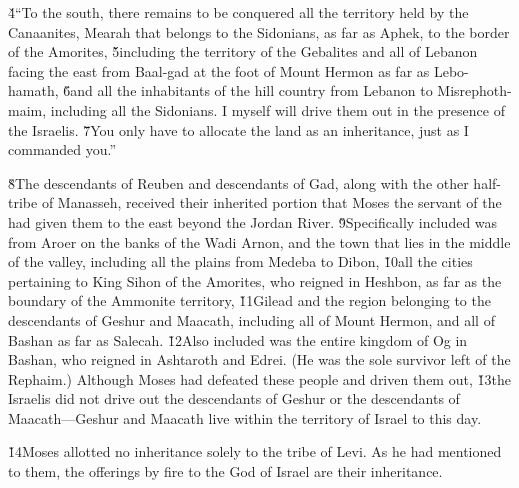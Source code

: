 \v{4}``To the south, there remains to be conquered all the territory held by the Canaanites, Mearah that belongs to the Sidonians, as far as Aphek, to the border of the Amorites, \v{5}including the territory of the Gebalites and all of Lebanon facing the east from Baal-gad at the foot of Mount Hermon as far as Lebo-hamath, \v{6}and all the inhabitants of the hill country from Lebanon to Misrephoth-maim, including all the Sidonians. I myself will drive them out in the presence of the Israelis. \v{7}You only have to allocate the land as an inheritance, just as I commanded you.''

\v{8}The descendants of Reuben and descendants of Gad, along with the other half-tribe of Manasseh, received their inherited portion that Moses the servant of the  had given them to the east beyond the Jordan River. \v{9}Specifically included was from Aroer on the banks of the Wadi Arnon, and the town that lies in the middle of the valley, including all the plains from Medeba to Dibon, \v{10}all the cities pertaining to King Sihon of the Amorites, who reigned in Heshbon, as far as the boundary of the Ammonite territory, \v{11}Gilead and the region belonging to the descendants of Geshur and Maacath, including all of Mount Hermon, and all of Bashan as far as Salecah. \v{12}Also included was the entire kingdom of Og in Bashan, who reigned in Ashtaroth and Edrei. (He was the sole survivor left of the Rephaim.) Although Moses had defeated these people and driven them out, \v{13}the Israelis did not drive out the descendants of Geshur or the descendants of Maacath---Geshur and Maacath live within the territory of Israel to this day.

\v{14}Moses allotted no inheritance solely to the tribe of Levi. As he had mentioned to them, the offerings by fire to the  God of Israel are their inheritance.

